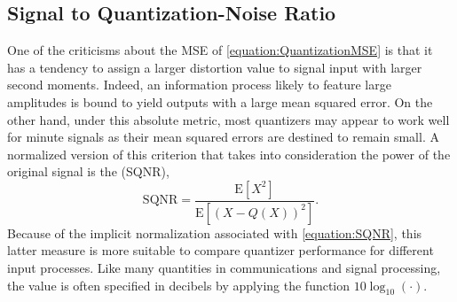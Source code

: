 \subsection{Signal to Quantization-Noise Ratio}

One of the criticisms about the MSE of \eqref{equation:QuantizationMSE} is that it has a tendency to assign a larger distortion value to signal input with larger second moments.
Indeed, an information process likely to feature large amplitudes is bound to yield outputs with a large mean squared error.
On the other hand, under this absolute metric, most quantizers may appear to work well for minute signals as their mean squared errors are destined to remain small.
A normalized version of this criterion that takes into consideration the power of the original signal is the  (SQNR),
\begin{equation} \label{equation:SQNR}
\text{SQNR}
= \frac{\mathrm{E} \left[ X^2 \right]}{\mathrm{E} \left[ (X - Q(X))^2 \right]} .
\end{equation}
Because of the implicit normalization associated with \eqref{equation:SQNR}, this latter measure is more suitable to compare quantizer performance for different input processes.
Like many quantities in communications and signal processing, the value is often specified in decibels by applying the function $10\log_{10}(\cdot)$.

